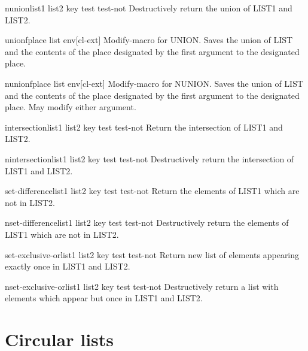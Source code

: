 \documentclass[10pt,english]{book}
\begin{document}
\begin{function}{nunion}{list1 list2 \key key test test-not}
  Destructively return the union of LIST1 and LIST2.
\end{function}

\begin{macro}{unionf}{place list \env env}[cl-ext]
  Modify-macro for UNION. Saves the union of LIST and the contents of the
place designated by the first argument to the designated place.
\end{macro}

\begin{macro}{nunionf}{place list \env env}[cl-ext]
  Modify-macro for NUNION. Saves the union of LIST and the contents of the
place designated by the first argument to the designated place. May modify
either argument.
\end{macro}

\begin{function}{intersection}{list1 list2 \key key test test-not}
  Return the intersection of LIST1 and LIST2.
\end{function}

\begin{function}{nintersection}{list1 list2 \key key test test-not}
  Destructively return the intersection of LIST1 and LIST2.
\end{function}

\begin{function}{set-difference}{list1 list2 \key key test test-not}
  Return the elements of LIST1 which are not in LIST2.
\end{function}

\begin{function}{nset-difference}{list1 list2 \key key test test-not}
  Destructively return the elements of LIST1 which are not in LIST2.
\end{function}

\begin{function}{set-exclusive-or}{list1 list2 \key key test test-not}
  Return new list of elements appearing exactly once in LIST1 and LIST2.
\end{function}

\begin{function}{nset-exclusive-or}{list1 list2 \key key test test-not}
  Destructively return a list with elements which appear but once in LIST1
   and LIST2.
\end{function}

\section{Circular lists}
\label{sec:circular-lists}
\end{document}
